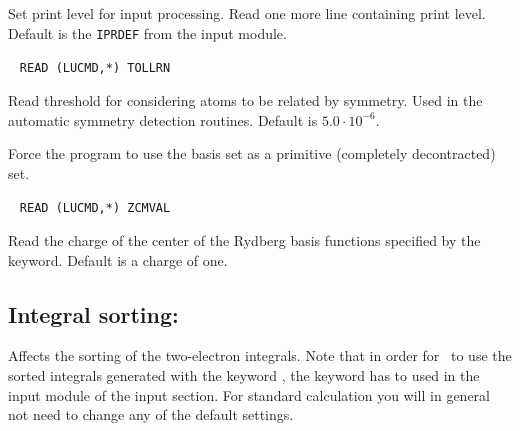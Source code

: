 \begin{description}
Set print level for input processing.  Read one more line containing
print level. Default is the \verb|IPRDEF| from the  input
module.

\item[\Key{SYMTHR}]\verb| |\newline
\verb|READ (LUCMD,*) TOLLRN|

Read threshold for considering atoms to be related by symmetry. Used
in the automatic symmetry detection routines. Default is $5.0\cdot
10^{-6}$.

\item[\Key{UNCONT}] Force the program to use the basis set as a primitive (completely decontracted) set.

\item[\Key{ZCMVAL}]\verb| |\newline
\verb|READ (LUCMD,*) ZCMVAL|

Read the charge of the center of the Rydberg basis functions specified
by the  keyword. Default is a charge of one.

\end{description}

\subsection{Integral sorting: }

Affects the sorting of the two-electron
integrals. Note that in order for \sir\ to use
the sorted integrals
generated with the keyword , the keyword
 has to used in the  input
module of the  input section. For standard
calculation you will in general not need to change any of the
default settings.

